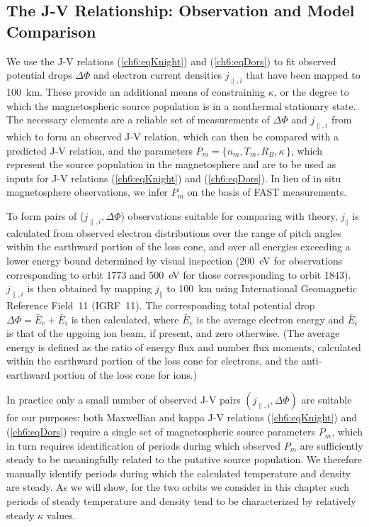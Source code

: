   \subsection{The J-V Relationship: Observation and Model Comparison} \label{ssJV}

  We use the J-V relations (\ref{ch6:eqKnight}) and (\ref{ch6:eqDors}) to fit
  observed potential drops $\Delta \Phi$ and electron current densities
  $j_{\parallel,i}$ that have been mapped to 100~km. These provide an additional
  means of constraining $\kappa$, or the degree to which the magnetospheric
  source population is in a nonthermal stationary state. The necessary elements
  are a reliable set of measurements of $\Delta \Phi$ and $j_{\parallel,i}$ from
  which to form an observed J-V relation, which can then be compared with a
  predicted J-V relation, and the parameters
  $P_m = \{ n_m, T_m, R_B, \kappa \, \}$, which represent the source population
  in the magnetosphere and are to be used as inputs for J-V relations
  (\ref{ch6:eqKnight}) and (\ref{ch6:eqDors}). In lieu of in situ magnetosphere
  observations, we infer $P_m$ on the basis of FAST measurements.

  To form pairs of ($j_{\parallel,i}, \Delta \Phi$) observations suitable for
  comparing with theory, $j_\parallel$ is calculated from observed electron
  distributions over the range of pitch angles within the earthward portion of
  the loss cone, and over all energies exceeding a lower energy bound determined
  by visual inspection (200~eV for observations corresponding to orbit 1773 and
  500~eV for those corresponding to orbit 1843).  $j_{\parallel,i}$ is then
  obtained by mapping $j_\parallel$ to 100~km using International Geomagnetic
  Reference Field~11 (IGRF~11). The corresponding total potential drop
  $\Delta \Phi = \bar{E}_e + \bar{E}_i$ is then calculated, where $\bar{E}_e$ is
  the average electron energy and $\bar{E}_i$ is that of the upgoing
  ion beam, if present, and zero otherwise. (The average energy is defined as
  the ratio of energy flux and number flux moments, calculated within the
  earthward portion of the loss cone for electrons, and the anti-earthward
  portion of the loss cone for ions.)

  In practice only a small number of observed J-V pairs
  $( j_{\parallel,i} , \Delta \Phi )$ are suitable for our purposes: both
  Maxwellian and kappa J-V relations (\ref{ch6:eqKnight}) and (\ref{ch6:eqDors})
  require a single set of magnetospheric source parameters $P_m$, which in turn
  requires identification of periods during which observed $P_m$ are
  sufficiently steady to be meaningfully related to the putative source
  population. We therefore manually identify periods during which the calculated
  temperature and density are steady. As we will show, for the two orbits we
  consider in this chapter such periods of steady temperature and density tend
  to be characterized by relatively steady $\kappa$ values.

